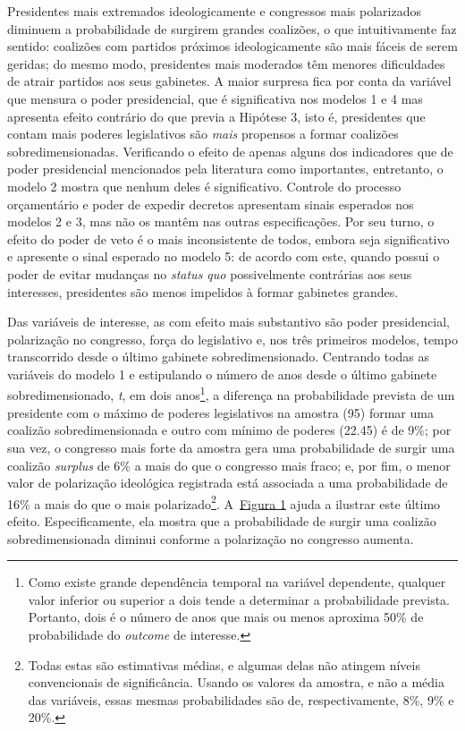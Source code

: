 Presidentes mais extremados ideologicamente e congressos mais polarizados diminuem a probabilidade de surgirem grandes coalizões, o que intuitivamente faz sentido: coalizões com partidos próximos ideologicamente são mais fáceis de serem geridas; do mesmo modo, presidentes mais moderados têm menores dificuldades de atrair partidos aos seus gabinetes. A maior surpresa fica por conta da variável que mensura o poder presidencial, que é significativa nos modelos 1 e 4 mas apresenta efeito contrário do que previa a Hipótese 3, isto é, presidentes que contam mais poderes legislativos são \textit{mais} propensos a formar coalizões sobredimensionadas. Verificando o efeito de apenas alguns dos indicadores que de poder presidencial mencionados pela literatura como importantes, entretanto, o modelo 2 mostra que nenhum deles é significativo. Controle do processo orçamentário e poder de expedir decretos apresentam sinais esperados nos modelos 2 e 3, mas não os mantêm nas outras especificações. Por seu turno, o efeito do poder de veto é o mais inconsistente de todos, embora seja significativo e apresente o sinal esperado no modelo 5: de acordo com este, quando possui o poder de evitar mudanças no \textit{status quo} possivelmente contrárias aos seus interesses, presidentes são menos impelidos à formar gabinetes grandes.

Das variáveis de interesse, as com efeito mais substantivo são poder presidencial, polarização no congresso, força do legislativo e, nos três primeiros modelos, tempo transcorrido desde o último gabinete sobredimensionado. Centrando todas as variáveis do modelo 1 e estipulando o número de anos desde o último gabinete sobredimensionado, \textit{t}, em dois anos\footnote{Como existe grande dependência temporal na variável dependente, qualquer valor inferior ou superior a dois tende a determinar a probabilidade prevista. Portanto, dois é o número de anos que mais ou menos aproxima 50\% de probabilidade do \textit{outcome} de interesse.}, a diferença na probabilidade prevista de um presidente com o máximo de poderes legislativos na amostra (95) formar uma coalizão sobredimensionada e outro com mínimo de poderes (22.45) é de 9\%; por sua vez, o congresso mais forte da amostra gera uma probabilidade de surgir uma coalizão \textit{surplus} de 6\% a mais do que o congresso mais fraco; e, por fim, o menor valor de polarização ideológica registrada está associada a uma probabilidade de 16\% a mais do que o mais polarizado\footnote{Todas estas são estimativas médias, e algumas delas não atingem níveis convencionais de significância. Usando os valores da amostra, e não a média das variáveis, essas mesmas probabilidades são de, respectivamente, 8\%, 9\% e 20\%.}. A~\hyperref[fig:figura1]{Figura 1} ajuda a ilustrar este último efeito. Especificamente, ela mostra que a probabilidade de surgir uma coalizão sobredimensionada diminui conforme a polarização no congresso aumenta.

